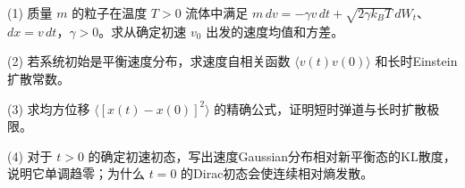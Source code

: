 (1) 质量 \(m\) 的粒子在温度 \(T>0\) 流体中满足 \(m\,dv=-\gamma v\,dt+\sqrt{2\gamma k_BT}\,dW_t\)、\(dx=v\,dt\)，\(\gamma>0\)。求从确定初速 \(v_0\) 出发的速度均值和方差。

(2) 若系统初始是平衡速度分布，求速度自相关函数 \(\langle v(t)v(0)\rangle\) 和长时Einstein扩散常数。

(3) 求均方位移 \(\langle[x(t)-x(0)]^2\rangle\) 的精确公式，证明短时弹道与长时扩散极限。

(4) 对于 \(t>0\) 的确定初速初态，写出速度Gaussian分布相对新平衡态的KL散度，说明它单调趋零；为什么 \(t=0\) 的Dirac初态会使连续相对熵发散。
